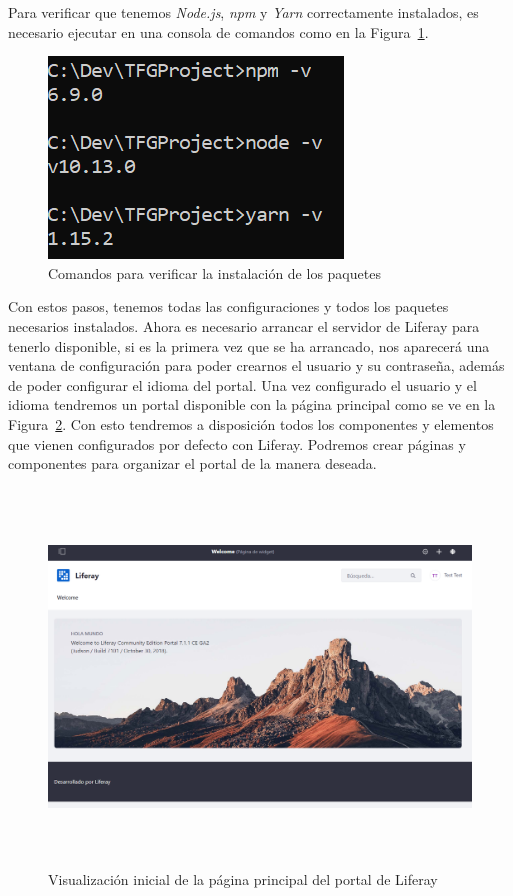 \documentclass[a4paper, 12pt]{book}
\begin{document}
\vspace{5mm}
Para verificar que tenemos \textit{Node.js}, \textit{npm} y \textit{Yarn} correctamente instalados, es necesario ejecutar en una consola de comandos como en la Figura~\ref{fig:verificacion}.
\begin{figure}
  \centering
  \includegraphics{img_usadas/verificacion.png}
  \caption{Comandos para verificar la instalación de los paquetes}
  \label{fig:verificacion}
\end{figure}

\vspace{20mm}
Con estos pasos, tenemos todas las configuraciones y todos los paquetes necesarios instalados. Ahora es necesario arrancar el servidor de Liferay para tenerlo disponible, si es la primera vez que se ha arrancado, nos aparecerá una ventana de configuración para poder crearnos el usuario y su contraseña, además de poder configurar el idioma del portal. Una vez configurado el usuario y el idioma tendremos un portal disponible con la página principal como se ve en la Figura~\ref{fig:liferay_ini}. Con esto tendremos a disposición todos los componentes y elementos que vienen configurados por defecto con Liferay. Podremos crear páginas y componentes para organizar el portal de la manera deseada.
\begin{figure}[h]
  \centering
  \includegraphics[width=15cm, height=10cm]{img_usadas/liferay_ini.png}
  \caption{Visualización inicial de la página principal del portal de Liferay}
  \label{fig:liferay_ini}
\end{figure}
\end{document}
